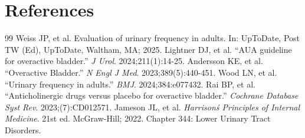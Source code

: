\section*{References}
\begin{thebibliography}{99}
 Weiss JP, et al. Evaluation of urinary frequency in adults. In: UpToDate, Post TW (Ed), UpToDate, Waltham, MA; 2025.
 Lightner DJ, et al. ``AUA guideline for overactive bladder.'' \emph{J Urol}. 2024;211(1):14-25.
 Andersson KE, et al. ``Overactive Bladder.'' \emph{N Engl J Med}. 2023;389(5):440-451.
 Wood LN, et al. ``Urinary frequency in adults.'' \emph{BMJ}. 2024;384:e077432.
 Rai BP, et al. ``Anticholinergic drugs versus placebo for overactive bladder.'' \emph{Cochrane Database Syst Rev}. 2023;(7):CD012571.
 Jameson JL, et al. \emph{Harrison\'s Principles of Internal Medicine}. 21st ed. McGraw-Hill; 2022. Chapter 344: Lower Urinary Tract Disorders.
\end{thebibliography}

